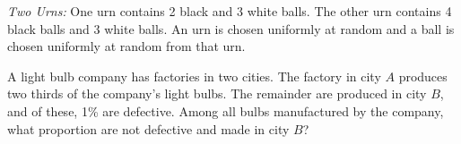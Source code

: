 \documentclass[addpoints,12pt]{exam}
\begin{document}
\begin{questions}
\vspace{1.2in}

\question[3]
\emph{Two Urns:} One urn contains 2 black and 3 white balls. The other urn contains 4 black balls and 3 white balls. An urn is chosen uniformly at random and a ball is chosen uniformly at random from that urn.
\noaddpoints
{}
\addpoints

\question[2] A light bulb company has factories in two cities. The factory in city $A$ produces two thirds of the company's light bulbs. The remainder are produced in city $B$, and of these, 1\% are defective. Among all bulbs manufactured by the company, what proportion are not defective and made in city $B$?
\end{questions}
\end{document}
